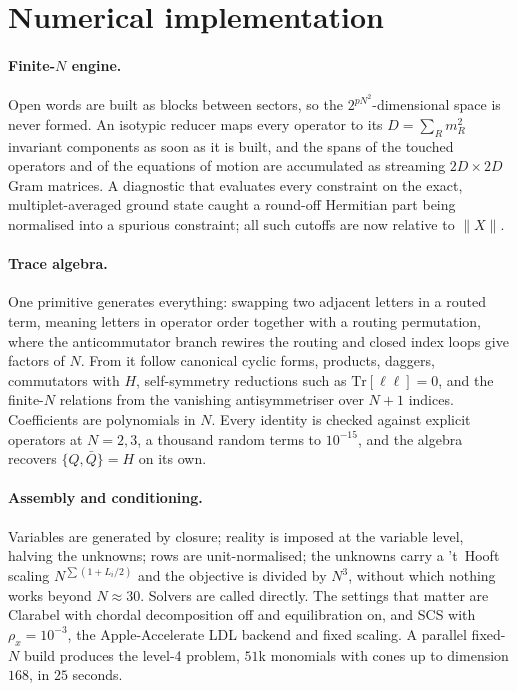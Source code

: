 \documentclass[10pt]{article}
\newcommand{\Tr}{\mathrm{Tr}}
\newcommand{\bQ}{\bar Q}
\begin{document}
\appendix
\section{Numerical implementation}\label{app:numerics}

\paragraph{Finite-$N$ engine.} Open words are built as blocks between sectors, so the $2^{pN^2}$-dimensional
space is never formed. An isotypic reducer maps every operator to its $D=\sum_Rm_R^2$ invariant components as
soon as it is built, and the spans of the touched operators and of the equations of motion are accumulated as
streaming $2D\times2D$ Gram matrices. A diagnostic that evaluates every constraint on the exact,
multiplet-averaged ground state caught a round-off Hermitian part being normalised into a spurious constraint;
all such cutoffs are now relative to $\|X\|$.

\paragraph{Trace algebra.} One primitive generates everything: swapping two adjacent letters in a routed term,
meaning letters in operator order together with a routing permutation, where the anticommutator branch rewires
the routing and closed index loops give factors of $N$. From it follow canonical cyclic forms, products,
daggers, commutators with $H$, self-symmetry reductions such as $\Tr[\ell\ell]=0$, and the finite-$N$ relations
from the vanishing antisymmetriser over $N+1$ indices. Coefficients are polynomials in $N$. Every identity is
checked against explicit operators at $N=2,3$, a thousand random terms to $10^{-15}$, and the algebra recovers
$\{Q,\bQ\}=H$ on its own.

\paragraph{Assembly and conditioning.} Variables are generated by closure; reality is imposed at the variable
level, halving the unknowns; rows are unit-normalised; the unknowns carry a 't~Hooft scaling
$N^{\sum(1+L_i/2)}$ and the objective is divided by $N^3$, without which nothing works beyond $N\approx30$.
Solvers are called directly. The settings that matter are Clarabel with chordal decomposition off and
equilibration on, and SCS with $\rho_x=10^{-3}$, the Apple-Accelerate LDL backend and fixed scaling. A parallel
fixed-$N$ build produces the level-4 problem, $51$k monomials with cones up to dimension $168$, in $25$ seconds.
\end{document}
